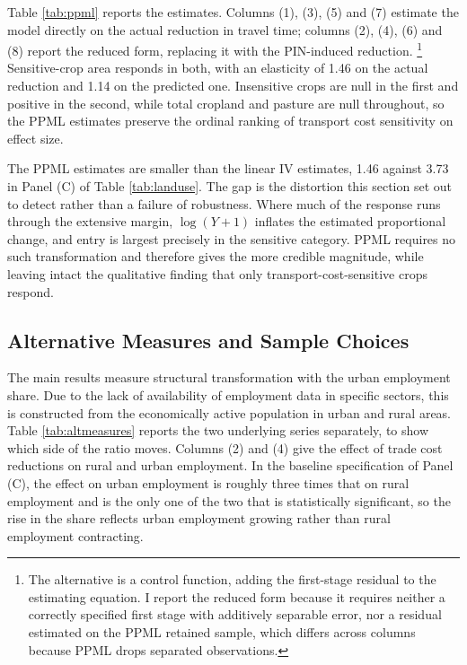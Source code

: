 \documentclass[11pt]{article}
\begin{document}
Table \ref{tab:ppml} reports the estimates. Columns (1), (3), (5) and (7) estimate the model directly on the actual reduction in travel time; columns (2), (4), (6) and (8) report the reduced form, replacing it with the PIN-induced reduction. \footnote{The alternative is a control function, adding the first-stage residual to the estimating equation. I report the reduced form because it requires neither a correctly specified first stage with additively separable error, nor a residual estimated on the PPML retained sample, which differs across columns because PPML drops separated observations.} Sensitive-crop area responds in both, with an elasticity of 1.46 on the actual reduction and 1.14 on the predicted one. Insensitive crops are null in the first and positive in the second, while total cropland and pasture are null throughout, so the PPML estimates preserve the ordinal ranking of transport cost sensitivity on effect size.

The PPML estimates are smaller than the linear IV estimates, 1.46 against 3.73 in Panel (C) of Table \ref{tab:landuse}. The gap is the distortion this section set out to detect rather than a failure of robustness. Where much of the response runs through the extensive margin, $\log(Y+1)$ inflates the estimated proportional change, and entry is largest precisely in the sensitive category. PPML requires no such transformation and therefore gives the more credible magnitude, while leaving intact the qualitative finding that only transport-cost-sensitive crops respond.

\subsection{Alternative Measures and Sample Choices}

The main results measure structural transformation with the urban employment share. Due to the lack of availability of employment data in specific sectors, this is constructed from the economically active population in urban and rural areas. Table \ref{tab:altmeasures} reports the two underlying series separately, to show which side of the ratio moves. Columns (2) and (4) give the effect of trade cost reductions on rural and urban employment. In the baseline specification of Panel (C), the effect on urban employment is roughly three times that on rural employment and is the only one of the two that is statistically significant, so the rise in the share reflects urban employment growing rather than rural employment contracting.
\end{document}
